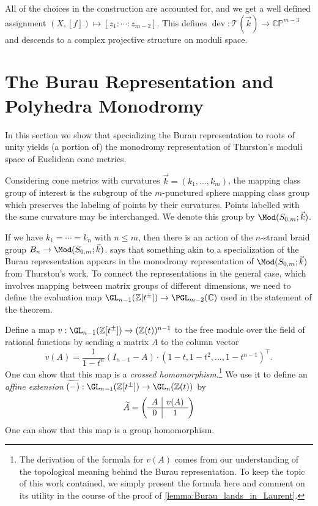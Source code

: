 \documentclass{amsart}
\begin{document}
    All of the choices in the construction are accounted for, and we get a well defined assignment $(X,[f]) \mapsto [z_1:\dotsb:z_{m-2}]$. This defines $\operatorname{dev}:\mathcal{T}(\vec k) \to \mathbb{CP}^{m-3}$ and descends to a complex projective structure on moduli space.

\section{The Burau Representation and Polyhedra Monodromy}\label{sec:Same Reps}
    In this section we show that specializing the Burau representation to roots of unity yields (a portion of) the monodromy representation of Thurston's moduli space of Euclidean cone metrics.
    
    Considering cone metrics with curvatures $\vec k = (k_1,\dotsc,k_m)$, the mapping class group of interest is the subgroup of the $m$-punctured sphere mapping class group which preserves the labeling of points by their curvatures. Points labelled with the same curvature may be interchanged. We denote this group by $\Mod(S_{0,m};\vec k)$.
    
    If we have $k_1=\dotsb=k_n$ with $n \leq m$, then there is an action of the $n$-strand braid group $B_n \to \Mod(S_{0,m};\vec k)$.  says that something akin to a specialization of the Burau representation appears in the monodromy representation of $\Mod(S_{0,m};\vec k)$ from Thurston's work. To connect the representations in the general case, which involves mapping between matrix groups of different dimensions, we need to define the evaluation map $\GL_{n-1}(\mathbb Z[t^\pm]) \to \PGL_{m-2}(\mathbb C)$ used in the statement of the theorem.

    \begin{definition}\label{def:affine_extension}
        Define a map $v:\GL_{n-1}(\mathbb Z[t^\pm]) \to (\mathbb Z(t))^{n-1}$ to the free module over the field of rational functions by sending a matrix $A$ to the column vector $$v(A) = \frac{1}{1-t^n} (I_{n-1}-A) \cdot \left( 1-t, 1-t^2,\dotsc,1-t^{n-1} \right)^\top.$$
        One can show that this map is a \textit{crossed homomorphism}.\footnote{The derivation of the formula for $v(A)$ comes from our understanding of the topological meaning behind the Burau representation. To keep the topic of this work contained, we simply present the formula here and comment on its utility in the course of the proof of \cref{lemma:Burau_lands_in_Laurent}.} We use it to define an \textit{affine extension} $\widetilde{(-)}:\GL_{n-1}(\mathbb Z[t^\pm]) \to \GL_n(\mathbb Z(t))$ by
        \begin{equation*}
            \widetilde A = \left( \begin{array}{c | c}
                A & v(A) \\ \hline 0 & 1
            \end{array} \right)
        \end{equation*}
        One can show that this map is a group homomorphism.
    \end{definition}
\end{document}
